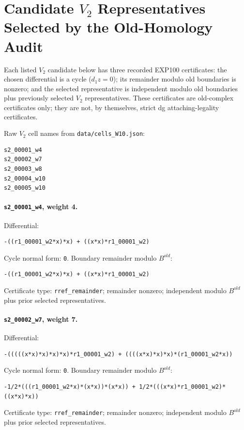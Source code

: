 \documentclass[11pt]{article}
\begin{document}
\section*{Candidate \(V_2\) Representatives Selected by the Old-Homology Audit}

Each listed \(V_2\) candidate below has three recorded EXP100 certificates:
the chosen differential is a cycle (\(d_1 z=0\)); its remainder modulo old
boundaries is nonzero; and the selected representative is independent modulo
old boundaries plus previously selected \(V_2\) representatives.  These
certificates are old-complex certificates only; they are not, by themselves,
strict dg attaching-legality certificates.

Raw \(V_2\) cell names from \texttt{data/cells\_W10.json}:
\begin{lstlisting}
s2_00001_w4
s2_00002_w7
s2_00003_w8
s2_00004_w10
s2_00005_w10
\end{lstlisting}

\paragraph{\texttt{s2\_00001\_w4}, weight 4.}
Differential:
\begin{lstlisting}
-((r1_00001_w2*x)*x) + ((x*x)*r1_00001_w2)
\end{lstlisting}
Cycle normal form: \texttt{0}.  Boundary remainder modulo \(B^{old}\):
\begin{lstlisting}
-((r1_00001_w2*x)*x) + ((x*x)*r1_00001_w2)
\end{lstlisting}
Certificate type: \texttt{rref\_remainder}; remainder nonzero; independent
modulo \(B^{old}\) plus prior selected representatives.

\paragraph{\texttt{s2\_00002\_w7}, weight 7.}
Differential:
\begin{lstlisting}
-(((((x*x)*x)*x)*x)*r1_00001_w2) + ((((x*x)*x)*x)*(r1_00001_w2*x))
\end{lstlisting}
Cycle normal form: \texttt{0}.  Boundary remainder modulo \(B^{old}\):
\begin{lstlisting}
-1/2*(((r1_00001_w2*x)*(x*x))*(x*x)) + 1/2*(((x*x)*r1_00001_w2)*((x*x)*x))
\end{lstlisting}
Certificate type: \texttt{rref\_remainder}; remainder nonzero; independent
modulo \(B^{old}\) plus prior selected representatives.
\end{document}

